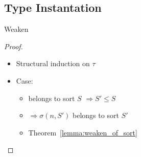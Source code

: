 \subsection{Type Instantation}
\begin{frame}{Weaken }
    \begin{theorem}
    \end{theorem}
    \begin{corollary}
    \end{corollary}
    \begin{proof}
        \begin{itemize}
            \item Structural induction on \(\tau\)
            \item Case: 
            \begin{itemize}
                \item {} belongs to sort \(S\) \(\Longrightarrow S' \leq S\)
                \item {} \(\Longrightarrow \sigma (n, S')\) belongs to sort \(S'\)
                \item Theorem~\ref{lemma:weaken_of_sort}
            \end{itemize}
        \end{itemize}
    \end{proof}
\end{frame}


